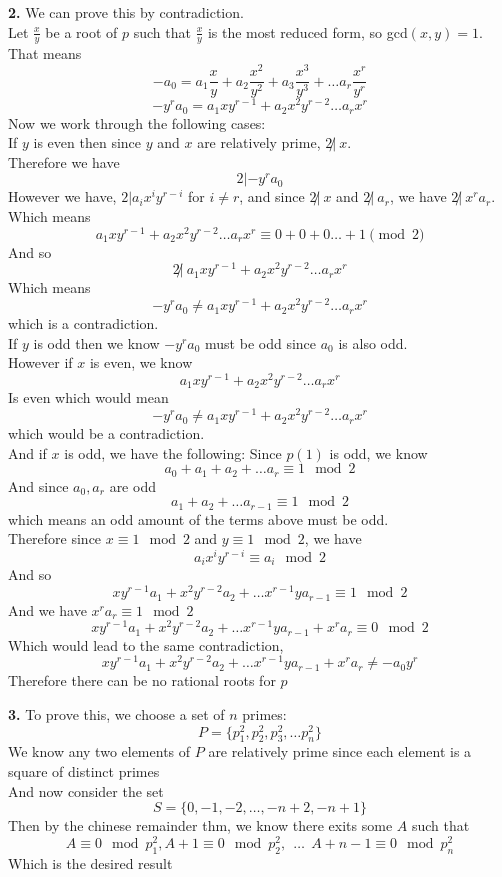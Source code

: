 \documentclass[12pt]{article}
\newenvironment{ques}{\vspace{2 ex}}{\vspace{2 ex}}
\theoremstyle{definition}
\begin{document}
\begin{ques}
	\textbf{2.} We can prove this by contradiction.\\
		Let $\frac{x}{y}$ be a root of $p$ such that $\frac{x}{y}$ is
		the most reduced form, so gcd$(x,y) = 1$.\\
		That means
		$$- a_0 = a_1\frac{x}{y} + a_2\frac{x^2}{y^2} +
		a_3\frac{x^3}{y^3} + \dots a_r\frac{x^r}{y^r}$$
		$$-y^ra_0 = a_1xy^{r-1} + a_2x^2y^{r-2} \dots a_rx^r$$
		Now we work through the following cases:\\
		If $y$ is even then since $y$ and $x$ are relatively prime, $2 \not| \ x$.\\
		Therefore we have 
		$$2|-y^ra_0$$ 
		However we have, $2|a_ix^iy^{r-i}$ for $i \neq r$, and since
		$2\not| \ x$ and $2 \not| \ a_r$, we have $2 \not| \ x^ra_r$. Which means
		$$a_1xy^{r-1} + a_2x^2y^{r-2} \dots a_rx^r \equiv 0 + 0 + 0
		\dots + 1 \pmod 2$$
		And so 
		$$2\not| \ a_1xy^{r-1} + a_2x^2y^{r-2} \dots a_rx^r$$ 
		Which means 
		$$-y^ra_0 \neq a_1xy^{r-1} + a_2x^2y^{r-2} \dots a_rx^r$$ 
		which is a contradiction.\\
		If $y$ is odd then we know $-y^ra_0$ must be odd since $a_0$ is also odd.\\
		However if $x$ is even, we know 
		$$a_1xy^{r-1} + a_2x^2y^{r-2} \dots a_rx^r $$
		Is even which would mean
		$$-y^ra_0 \neq a_1xy^{r-1} + a_2x^2y^{r-2} \dots a_rx^r$$
		which would be a contradiction. \\
		And if $x$ is odd, we have the following:
		Since $p(1)$ is odd, we know
		$$a_0 + a_1 + a_2 + \dots a_r \equiv 1 \mod 2$$
		And since $a_0, a_r$ are odd
		$$a_1 + a_2 + \dots a_{r-1} \equiv 1 \mod 2$$
		which means an odd amount of the terms above must be odd.\\
		Therefore since $x \equiv 1 \mod 2$ and $y \equiv 1 \mod 2$, we have 
		$$a_ix^iy^{r-i} \equiv a_i \mod 2$$
		And so 
		$$xy^{r-1}a_1 + x^2y^{r-2}a_2 + \dots x^{r-1}ya_{r-1} \equiv 1 \mod 2$$
		And we have $x^ra_r \equiv 1 \mod 2$
		$$xy^{r-1}a_1 + x^2y^{r-2}a_2 + \dots x^{r-1}ya_{r-1} + x^ra_r
		\equiv 0 \mod 2$$
		Which would lead to the same contradiction,
		$$xy^{r-1}a_1 + x^2y^{r-2}a_2 + \dots x^{r-1}ya_{r-1} + x^ra_r \neq -a_0y^r$$
		Therefore there can be no rational roots for $p$

\end{ques}

\begin{ques}
	\textbf{3.} To prove this, we choose a set of $n$ primes: 
		$$P = \{p_1^2, p_2^2, p_3^2, \dots p_n^2\}$$
		We know any two elements of $P$ are relatively prime since each
		element is a square of distinct primes\\
		And now consider the set
		$$S = \{0, -1, -2, \dots, -n + 2, -n + 1\}$$
		Then by the chinese remainder thm, we know there exits some $A$ such that
		$$A \equiv 0 \mod{p_1^2}, A + 1 \equiv 0 \mod{p_2^2},\ \ \dots
		\ \ A + n -1 \equiv 0 \mod{p_n^2}$$
		Which is the desired result
\end{ques}
\end{document}
